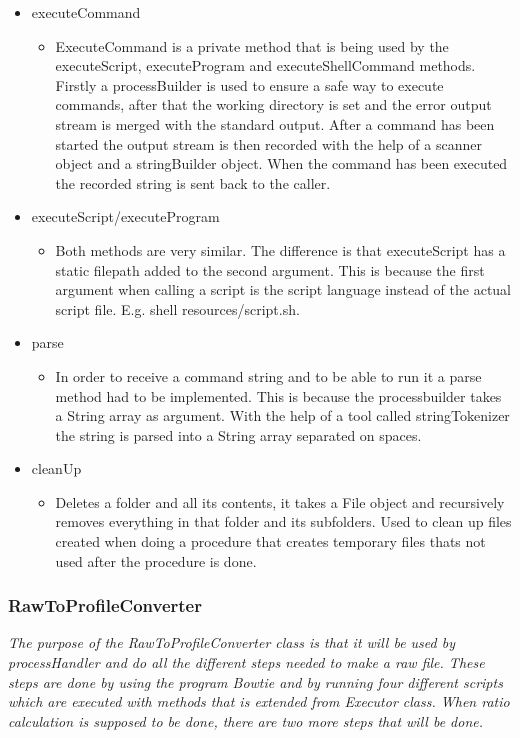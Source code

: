 \begin{itemize} 
\item executeCommand
\begin{itemize}
\item ExecuteCommand is a private method that is being used by the executeScript, executeProgram and executeShellCommand methods. Firstly a processBuilder is used to ensure a safe way to execute commands, after that the working directory is set and the error output stream is merged with the standard output.
After a command has been started the output stream is then recorded with the help of a scanner object and a stringBuilder object. When the command has been executed the recorded string is sent back to the caller.
\end{itemize}
\item executeScript/executeProgram
\begin{itemize}
\item Both methods are very similar. The difference is that executeScript has a static filepath added to the second argument. This is because the first argument when calling a script is the script language instead of the actual script file. E.g. shell resources/script.sh.
\end{itemize}

\item parse
\begin{itemize}
\item In order to receive a command string and to be able to run it a parse method had to be implemented. This is because the processbuilder takes a String array as argument. With the help of a tool called stringTokenizer the string is parsed into a String array separated on spaces.
\end{itemize}
 
\item cleanUp
\begin{itemize}
\item Deletes a folder and all its contents, it takes a File object and recursively removes everything in that folder and its subfolders. Used to clean up files created when doing a procedure that creates temporary files thats not used after the procedure is done.
\end{itemize}

\end{itemize}

\subsubsection{RawToProfileConverter}
\emph{The purpose of the RawToProfileConverter class is that it will be used by processHandler and do all the different steps needed to make a raw file. These steps are done by using the program Bowtie and by running four different scripts which are executed with methods that is extended from Executor class. When ratio calculation is supposed to be done, there are two more steps that will be done.}

